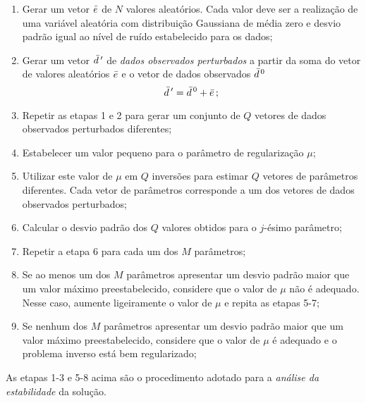 \begin{enumerate}
\item Gerar um vetor $\bar{e}$ de $N$ valores aleatórios.
Cada valor deve ser a realização de uma variável aleatória com distribuição
Gaussiana de média zero e desvio padrão igual ao nível de ruído estabelecido
para os dados;
\item Gerar um vetor $\bar{d}\thinspace'$ de {\it dados observados perturbados} a partir
da soma do vetor de valores aleatórios $\bar{e}$ e o vetor de dados observados
$\bar{d}^{\thinspace 0}$
\[
\bar{d}\thinspace' = \bar{d}^{\thinspace 0} + \bar{e} \thinspace ;
\]
\item Repetir as etapas 1 e 2 para gerar um conjunto de $Q$ vetores de dados
observados perturbados diferentes;
\item Estabelecer um valor pequeno para o parâmetro de regularização $\mu$;
\item Utilizar este valor de $\mu$ em $Q$ inversões para estimar $Q$ vetores de
parâmetros diferentes. Cada vetor de parâmetros corresponde a um dos vetores de
dados observados perturbados;
\item Calcular o desvio padrão dos $Q$ valores obtidos para o $j$-ésimo parâmetro;
\item Repetir a etapa 6 para cada um dos $M$ parâmetros;
\item Se ao menos um dos $M$ parâmetros apresentar um desvio padrão maior que um
valor máximo preestabelecido, considere que o valor de $\mu$ não é adequado.
Nesse caso, aumente ligeiramente o valor de $\mu$ e repita as etapas 5-7;
\item Se nenhum dos $M$ parâmetros apresentar um desvio padrão maior que um
valor máximo preestabelecido, considere que o valor de $\mu$ é adequado e o
problema inverso está bem regularizado;
\end{enumerate}

\noindent As etapas 1-3 e 5-8 acima são o procedimento adotado para a
{\it análise da estabilidade} da solução.
